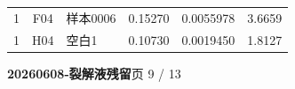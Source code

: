 \documentclass[UTF8,10pt,a4paper,fontset=fandol]{ctexart}
\newcommand{\fieldvalue}[1]{#1}
\begin{document}
\begin{center}
\begin{tabular}{c|c|p{1.5cm}|p{1.0cm}|p{1.2cm}|p{1.0cm}}
\fieldvalue{1} &
\fieldvalue{F04} &
\fieldvalue{样本0006} &
\fieldvalue{0.15270} &
\fieldvalue{0.0055978} &
\fieldvalue{3.6659} \\

\fieldvalue{1} &
\fieldvalue{H04} &
\fieldvalue{空白1} &
\fieldvalue{0.10730} &
\fieldvalue{0.0019450} &
\fieldvalue{1.8127}
\end{tabular}
\end{center}


\newpage

\begin{center}
\textbf{20260608-裂解液残留}\hfill 页 9 / 13
\end{center}
\end{document}
